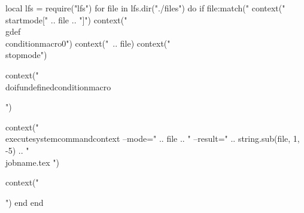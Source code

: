 \startluacode
local lfs = require("lfs")
for file in lfs.dir("./files") do
	if file:match("%
		context("\\startmode[" .. file .. "]")
		context("\\gdef\\conditionmacro{0}")
		context("\ .. file)
		context("\\stopmode")

		context("\\doifundefined{conditionmacro}{")

		context("\\executesystemcommand{context --mode=" .. file .. " --result=" .. string.sub(file, 1, -5) .. " \\jobname.tex }")

		context("}")
	end
end
\stopluacode
